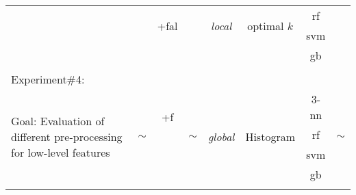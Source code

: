 \begin{landscape}
\begin{table}[ht]
{\begin{center}
{\begin{tabular}{l  c	 c  c  c  c  c  c  }
 & & \multirow{2}{*}{+\acs{fal}} & & \multirow{2}{*}{\emph{local}} & \multirow{2}{*}{optimal $k$} & \ac{rf} &  \\
 & & & & & & \ac{svm} &  \\
 & & & & & & \ac{gb} &  \\
\midrule
\\
Experiment\#4:\\
\multirow{4}{4cm}{Goal: Evaluation of different pre-processing for low-level features} & \multirow{4}{*}{$\sim$} & \multirow{2}{*}{ +\acs{f}} & \multirow{4}{*}{$\sim$} & \multirow{4}{*}{\emph{global}} & \multirow{4}{*}{Histogram} & $3$-\ac{nn} & \multirow{4}{*}{$\sim$}\\
& & \multirow{2}{*}{+\ac{fal}} & & & & \ac{rf} &  \\
& & & & & & \ac{svm} &  \\
& & & & & & \ac{gb} &  \\
\\
\bottomrule


\end{tabular}}
\end{center}}
\label{tab:experiment_summary}
\end{table}
\end{landscape}
